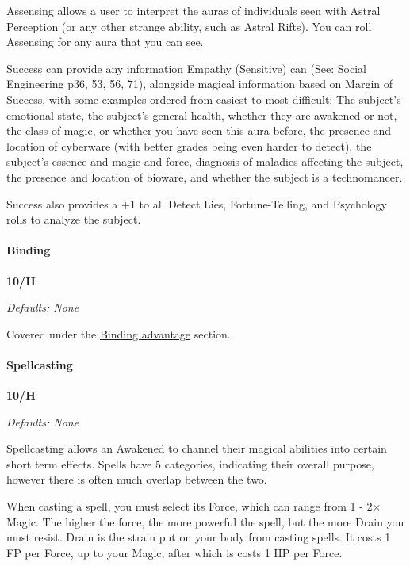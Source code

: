 \begin{multicols*}{3}
	Assensing allows a user to interpret the auras of individuals seen with Astral Perception (or any other strange ability, such as Astral Rifts). You can roll Assensing for any aura that you can see.
	
	Success can provide any information Empathy (Sensitive) can (See: Social Engineering p36, 53, 56, 71), alongside magical information based on Margin of Success, with some examples ordered from easiest to most difficult: The subject's emotional state, the subject's general health, whether they are awakened or not, the class of magic, or whether you have seen this aura before, the presence and location of cyberware (with better grades being even harder to detect), the subject's essence and magic and force, diagnosis of maladies affecting the subject, the presence and location of bioware, and whether the subject is a technomancer. 
	
	Success also provides a +1 to all Detect Lies, Fortune-Telling, and Psychology rolls to analyze the subject.
	
	\paragraph{Binding}
	\begin{flushright}
		\textbf{10/H}
	\end{flushright}
	\textcolor{NavyBlue}{\textit{Defaults: None}}
	
	Covered under the \hyperref[binding]{Binding advantage} section.
	
	\paragraph{Spellcasting}\label{spellcasting_skill}
	\begin{flushright}
		\textbf{10/H}
	\end{flushright}
	\textcolor{NavyBlue}{\textit{Defaults: None}}
	
	Spellcasting allows an Awakened to channel their magical abilities into certain short term effects. Spells have 5 categories, indicating their overall purpose, however there is often much overlap between the two.
	
	When casting a spell, you must select its Force, which can range from 1 - 2\(\times\)Magic. The higher the force, the more powerful the spell, but the more Drain you must resist. Drain is the strain put on your body from casting spells. It costs 1 FP per Force, up to your Magic, after which is costs 1 HP per Force. 
	

\end{multicols*}
